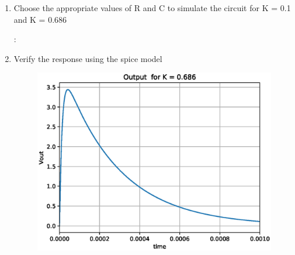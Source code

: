 \begin{enumerate}[label=\arabic*.,ref=\theenumi]
\item Choose the appropriate values of R and C to simulate the circuit for K = 0.1 and K = 0.686

\solution :

\begin{table}[!ht]
\centering

\caption{}
\label{table:ee18btech11030_table2}
\end{table}
\item Verify the response using the spice model

\solution 

\begin{figure}[!ht]
\centering
  \includegraphics[width=\columnwidth]{./figs/ee18btech11030/ee18btech11030_spice_fc4.eps}
\caption{}
\label{fig:ee18btech11030_fig9} 
\end{figure}


\end{enumerate}
